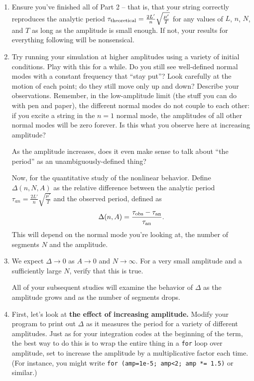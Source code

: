 \documentclass[12pt]{article}
\begin{document}
\begin{enumerate}

\item Ensure you've finished all of Part 2 -- that is, that your string correctly reproduces the analytic period $\tau_{\rm theoretical} = \frac{2L'}{n} \sqrt{\frac{\mu'}{T}}$ for any values of $L$, $n$, $N$, and $T$ as long as the amplitude is small enough. If not, your results for everything following will be nonsensical.

\item Try running your simulation at higher amplitudes using a variety of initial conditions. Play with this for a while. 
Do you still see well-defined normal modes with a constant frequency that ``stay put''? Look carefully at the motion of each point; do they still move only up and down? Describe your observations.
Remember, in the low-amplitude limit (the stuff you can do with pen and paper), the different normal modes do not couple to each other: if you excite a string in the $n=1$ normal mode, 
the amplitudes of all other normal modes will be zero forever. Is this what you observe here at increasing amplitude? 

As the amplitude increases, does it even make sense to talk about ``the period'' as an unambiguously-defined thing?

Now, for the quantitative study of the nonlinear behavior. Define $\Delta(n,N,A)$ as the relative difference between the analytic period $\tau_{an} = \frac{2L'}{n}\sqrt{\frac{\mu'}{T}}$ and the observed period, defined as $$\Delta(n,A) = \frac{\tau_{\rm {obs}}-\tau_{\rm{an}}}{\tau_{\rm{an}}}.$$ This will depend on the normal mode you're looking at, the number of segments $N$ and the amplitude. 

\item We expect $\Delta \rightarrow 0$ as $A \rightarrow 0$ and $N \rightarrow \infty$. For a very small amplitude and a sufficiently large $N$, verify that this is true.

All of your subsequent studies will examine the behavior of $\Delta$ as the amplitude grows and as the number of segments drops.



\item First, let's look at {\bf the effect of increasing amplitude.} Modify your program to print out $\Delta$ as it measures the period for a variety of different amplitudes. Just as for your integration codes at the beginning of the term, the best
way to do this is to wrap the entire thing in a {\tt for} loop over amplitude, set to increase the amplitude by a multiplicative factor each time. (For instance, you might write
{\tt for (amp=1e-5; amp<2; amp *= 1.5)} or similar.) 


\end{enumerate}
\end{document}
